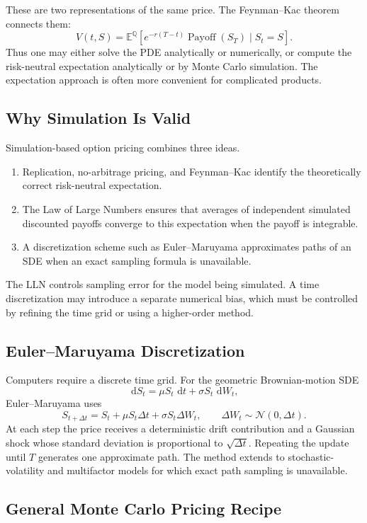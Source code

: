 \documentclass[12pt,openany]{book}
\theoremstyle{definition}
\theoremstyle{remark}
\newcommand{\E}{\mathbb{E}}
\newcommand{\dd}{\,\mathrm{d}}
\begin{document}
These are two representations of the same price. The Feynman--Kac theorem
connects them:
\[
\boxed{
V(t,S)
=\E^{\mathbb{Q}}\!\left[
e^{-r(T-t)}\operatorname{Payoff}(S_T)
\mid S_t=S
\right].
}
\]
Thus one may either solve the PDE analytically or numerically, or compute the
risk-neutral expectation analytically or by Monte Carlo simulation. The
expectation approach is often more convenient for complicated products.

\subsection{Why Simulation Is Valid}

Simulation-based option pricing combines three ideas.
\begin{enumerate}
    \item Replication, no-arbitrage pricing, and Feynman--Kac identify the
    theoretically correct risk-neutral expectation.
    \item The Law of Large Numbers ensures that averages of independent
    simulated discounted payoffs converge to this expectation when the
    payoff is integrable.
    \item A discretization scheme such as Euler--Maruyama approximates paths
    of an SDE when an exact sampling formula is unavailable.
\end{enumerate}

The LLN controls sampling error for the model being simulated. A time
discretization may introduce a separate numerical bias, which must be
controlled by refining the time grid or using a higher-order method.

\subsection{Euler--Maruyama Discretization}

Computers require a discrete time grid. For the geometric Brownian-motion
SDE
\[
\dd S_t=\mu S_t\,\dd t+\sigma S_t\,\dd W_t,
\]
Euler--Maruyama uses
\[
\boxed{
S_{t+\Delta t}
=S_t+\mu S_t\Delta t+\sigma S_t\Delta W_t,
\qquad
\Delta W_t\sim\mathcal{N}(0,\Delta t).
}
\]
At each step the price receives a deterministic drift contribution and a
Gaussian shock whose standard deviation is proportional to
\(\sqrt{\Delta t}\). Repeating the update until \(T\) generates one
approximate path. The method extends to stochastic-volatility and
multifactor models for which exact path sampling is unavailable.

\subsection{General Monte Carlo Pricing Recipe}
\end{document}
